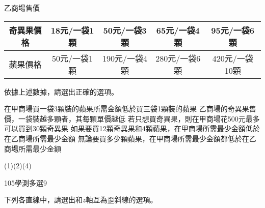 \begin{QUESTIONS}
\begin{QUESTION}
\begin{QBODY}
			乙商場售價
			\begin{tabular}{|c|c|c|c|c|}
			\hline			
			奇異果價格  & 18元/一袋1顆	& 50元/一袋3顆	& 65元/一袋4顆	& 95元/一袋6顆 \\\hline
			蘋果價格	& 50元/一袋1顆	& 190元/一袋4顆	& 280元/一袋6顆	& 420元/一袋10顆\\\hline
			\end{tabular}
			依據上述數據，請選出正確的選項。
			\begin{QOPS}
				\QOP 在甲商場買一袋3顆裝的蘋果所需金額低於買三袋1顆裝的蘋果
				\QOP 乙商場的奇異果售價，一袋裝越多顆者，其每顆單價越低
				\QOP 若只想買奇異果，則在甲商場花500元最多可以買到30顆奇異果
				\QOP 如果要買12顆奇異果和4顆蘋果，在甲商場所需最少金額低於在乙商場所需最少金額
				\QOP 無論要買多少顆蘋果，在甲商場所需最少金額都低於在乙商場所需最少金額
			\end{QOPS}
        \end{QBODY}
        \begin{QFROMS}
        \end{QFROMS}
        \begin{QTAGS}\end{QTAGS}
        \begin{QANS}
            (1)(2)(4)
        \end{QANS}
        \begin{QSOLLIST}
        \end{QSOLLIST}
        \begin{QEMPTYSPACE}
        \end{QEMPTYSPACE}
    \end{QUESTION}
    \begin{QUESTION}
        \begin{ExamInfo}{105}{學測}{多選}{9}
        \end{ExamInfo}
        \begin{ExamAnsRateInfo}{46}{77}{40}{21}
        \end{ExamAnsRateInfo}
        \begin{QBODY}
		下列各直線中，請選出和$z$軸互為歪斜線的選項。
			\begin{QOPS}
				\QOP ${{L}_{1}}:\text{ }\left\{ \begin{aligned}
				  & x=0 \\ 
				 & z=0 \\ 
				\end{aligned} \right.$	
                \QOP ${{L}_{\text{2}}}:\text{ }\left\{ \begin{aligned}
				  & y=0 \\ 

\end{aligned}
\end{QOPS}
\end{QBODY}
\end{QUESTION}
\end{QUESTIONS}
